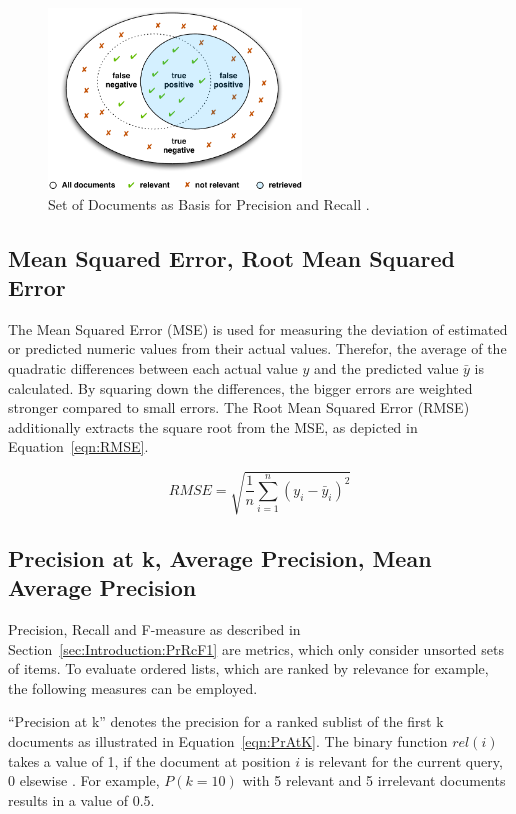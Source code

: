 \begin{figure}[t!]
\label{fig:PrecisionRecall}
\centering
\includegraphics[width=0.6\textwidth]{img/PrecisionRecallSets.pdf}
\caption{Set of Documents as Basis for Precision and Recall \cite{katz2010diploma}.}
\end{figure}

\subsection{Mean Squared Error, Root Mean Squared Error}

The Mean Squared Error (MSE) is used for measuring the deviation of estimated or predicted numeric values from their actual values. Therefor, the average of the quadratic differences between each actual value $y$ and the predicted value $\bar y$ is calculated. By squaring down the differences, the bigger errors are weighted stronger compared to small errors. The Root Mean Squared Error (RMSE) additionally extracts the square root from the MSE, as depicted in Equation~\ref{eqn:RMSE}.

\begin{equation}
	\label{eqn:RMSE}
	\mathit{RMSE} = \sqrt{\frac{1}{n} \sum\limits_{i=1}^{n}(y_i - \bar y_i)^2}
\end{equation}

\subsection{Precision at k, Average Precision, Mean Average Precision}

Precision, Recall and F-measure as described in Section~\ref{sec:Introduction:PrRcF1} are metrics, which only consider unsorted sets of items. To evaluate ordered lists, which are ranked by relevance for example, the following measures can be employed.

``Precision at k'' denotes the precision for a ranked sublist of the first k documents as illustrated in Equation~\ref{eqn:PrAtK}. The binary function $rel(i)$ takes a value of 1, if the document at position $i$ is relevant for the current query, 0 elsewise \cite{Mahesh:1999}. For example, $P(k = 10)$ with 5 relevant and 5 irrelevant documents results in a value of 0.5.

